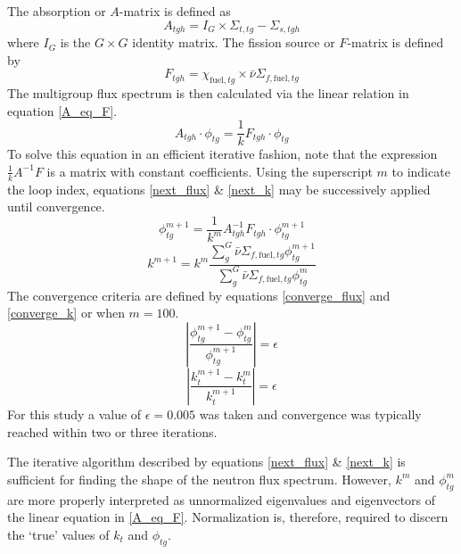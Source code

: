The absorption or $A$-matrix is defined as 
\begin{equation}
\label{A_matrix}
A_{tgh} = I_G \times \Sigma_{t,tg} - \Sigma_{s,tgh}
\end{equation}
where $I_G$ is the $G \times G$ identity matrix. The fission source or $F$-matrix is defined by
\begin{equation}
\label{F_matrix}
F_{tgh} = \chi_{\mbox{fuel},tg} \times \bar{\nu} \Sigma_{f,\mbox{fuel},tg}
\end{equation}
The multigroup flux spectrum is then calculated via the linear relation in equation \ref{A_eq_F}.
\begin{equation}
\label{A_eq_F}
A_{tgh} \cdot \phi_{tg} = \frac{1}{k} F_{tgh} \cdot \phi_{tg}
\end{equation}
To solve this equation in an efficient iterative fashion, note that the expression 
$\frac{1}{k}A^{-1}F$ is a matrix with constant coefficients.
Using the superscript $m$ to indicate the loop
index, equations \ref{next_flux} \& \ref{next_k} may be successively applied 
until convergence.
\begin{equation}
\label{next_flux}
\phi_{tg}^{m+1} = \frac{1}{k^m} A_{tgh}^{-1} F_{tgh} \cdot \phi_{tg}^{m+1}
\end{equation}
\begin{equation}
\label{next_k}
k^{m+1} = k^m  \frac{\sum_g^G \bar{\nu} \Sigma_{f,\mbox{fuel},tg} \phi_{tg}^{m+1}}
                         {\sum_g^G \bar{\nu} \Sigma_{f,\mbox{fuel},tg} \phi_{tg}^m}
\end{equation}
The convergence criteria are defined by equations \ref{converge_flux} and \ref{converge_k}
or when $m=100$.
\begin{equation}
\label{converge_flux}
\left|\frac{\phi_{tg}^{m+1} - \phi_{tg}^m}{\phi_{tg}^{m+1}}\right| = \epsilon
\end{equation}
\begin{equation}
\label{converge_k}
\left|\frac{k_t^{m+1} - k_t^m}{k_t^{m+1}}\right| = \epsilon
\end{equation}
For this study a value of $\epsilon=0.005$ was taken and convergence was typically 
reached within two or three iterations.

The iterative algorithm described by equations \ref{next_flux} \& \ref{next_k} is 
sufficient for finding the shape of the neutron flux spectrum.  However, $k^m$ and 
$\phi_{tg}^m$ are more properly interpreted as unnormalized eigenvalues and eigenvectors
of the linear equation in \ref{A_eq_F}.  Normalization is, therefore, required to 
discern the `true' values of  $k_t$ and $\phi_{tg}$.

